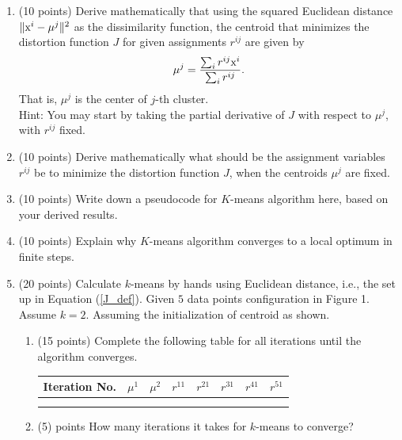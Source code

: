 \documentclass[twoside,10pt]{article}
\begin{document}
\begin{enumerate}

\item (10 points) Derive mathematically that using the squared Euclidean distance $\|\text x^i-\mu^j\|^2$ as the dissimilarity function, the centroid that minimizes the distortion function $J$  for given assignments $r^{ij}$ are given by
   $$\mu^j=\frac{\sum_i r^{ij} \text x^i}{\sum_i r^{ij}}.$$
   That is, $\mu^j$ is the center of $j$-th cluster.  \\
   Hint: You may start by taking the partial derivative of $J$ with respect to $\mu^j$, with $r^{ij}$ fixed.
   
   
\item (10 points) Derive mathematically what should be the assignment variables $r^{ij}$ be to minimize the distortion function $J$, when the centroids $\mu^j$ are fixed.
   
\item (10 points) Write down a pseudocode for $K$-means algorithm here, based on your derived results. 

\item (10 points) Explain why $K$-means algorithm converges to a local optimum in finite steps. 

\item (20 points) Calculate $k$-means by hands using Euclidean distance, i.e., the set up in Equation (\ref{J_def}).  Given $5$ data points configuration in Figure 1. Assume $k = 2$.  Assuming the initialization of centroid as shown.

\begin{enumerate}
\item (15 points) Complete the following table for all iterations until the algorithm converges.
\begin{table}[h!]
\begin{center}
\begin{tabular}{c|c|c|c|c|c|c|c}
Iteration No. & $\mu^1$ & $\mu^2$ & $r^{11}$ &  $r^{21}$ &  $r^{31}$ &  $r^{41}$ &  $r^{51}$ \\\hline
& & & &  & & &\\\hline
& & & &  & & &\\
\end{tabular}
\end{center}
\end{table}
\item (5) points How many iterations it takes for $k$-means to converge?
\end{enumerate} 


\end{enumerate}
\end{document}
